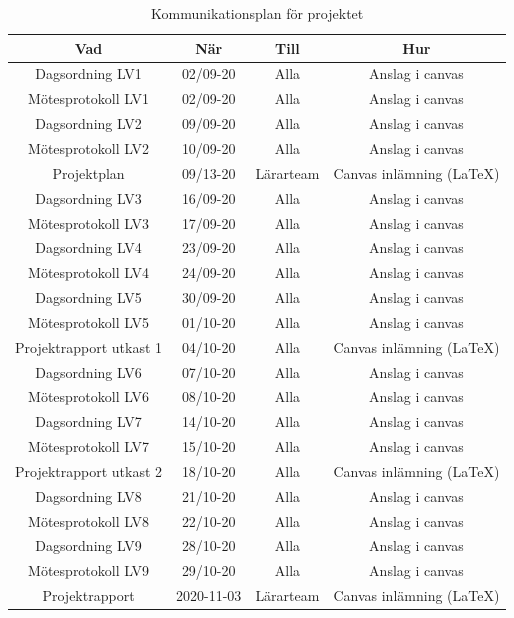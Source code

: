 \documentclass[a4paper]{article}
\begin{document}
\begin{table}[H]
    \centering
    \begin{tabular}{ |c|c|c|c| }\hline
     Vad & När & Till & Hur \\\hline
     Dagsordning LV1 & 02/09-20 & Alla & Anslag i canvas \\\hline
     Mötesprotokoll LV1 & 02/09-20 & Alla & Anslag i canvas \\\hline
     Dagsordning LV2 & 09/09-20 & Alla & Anslag i canvas \\\hline
     Mötesprotokoll LV2 & 10/09-20 & Alla & Anslag i canvas \\\hline
     Projektplan & 09/13-20 & Lärarteam & Canvas inlämning (LaTeX) \\\hline
     Dagsordning LV3 & 16/09-20 & Alla & Anslag i canvas \\\hline
     Mötesprotokoll LV3 & 17/09-20 & Alla & Anslag i canvas \\\hline
     Dagsordning LV4 & 23/09-20 & Alla & Anslag i canvas \\\hline
     Mötesprotokoll LV4 & 24/09-20 & Alla & Anslag i canvas \\\hline
     Dagsordning LV5 & 30/09-20 & Alla & Anslag i canvas \\\hline
     Mötesprotokoll LV5 & 01/10-20 & Alla & Anslag i canvas \\\hline
     Projektrapport utkast 1 & 04/10-20 & Alla & Canvas inlämning (LaTeX) \\\hline
     Dagsordning LV6 & 07/10-20 & Alla & Anslag i canvas \\\hline
     Mötesprotokoll LV6 & 08/10-20 & Alla & Anslag i canvas \\\hline
     Dagsordning LV7 & 14/10-20 & Alla & Anslag i canvas \\\hline
     Mötesprotokoll LV7 & 15/10-20 & Alla & Anslag i canvas \\\hline
     Projektrapport utkast 2 & 18/10-20 & Alla & Canvas inlämning (LaTeX) \\\hline
     Dagsordning LV8 & 21/10-20 & Alla & Anslag i canvas \\\hline
     Mötesprotokoll LV8 & 22/10-20 & Alla & Anslag i canvas \\\hline
     Dagsordning LV9 & 28/10-20 & Alla & Anslag i canvas \\\hline
     Mötesprotokoll LV9 & 29/10-20 & Alla & Anslag i canvas \\\hline
     Projektrapport & 2020-11-03 & Lärarteam & Canvas inlämning (LaTeX) \\\hline
    \end{tabular}
    \caption{Kommunikationsplan för projektet}
    \label{table:kommunikationsplan}
\end{table}
\end{document}
